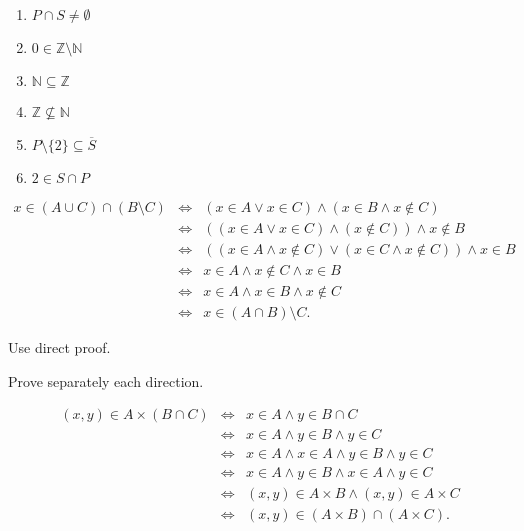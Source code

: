 \begin{answer}{2.2}
    \begin{enumerate}[label=(\roman*)]
        \item $P\cap S \neq \emptyset$
        \item $0 \in \mathbb{Z}\setminus \mathbb{N}$
        \item $\mathbb{N}\subseteq \mathbb{Z}$
        \item $\mathbb{Z}\nsubseteq \mathbb{N}$
        \item $P\setminus \{2\} \subseteq \overline{S}$
        \item $2\in S\cap P$
    \end{enumerate}
\end{answer}
\begin{answer}{2.4}
\begin{eqnarray*}
x\in (A\cup C)\cap (B\setminus C) &\Leftrightarrow & (x\in A \vee x\in C) \wedge (x\in B \wedge x\notin C)\\
 &\Leftrightarrow & ((x\in A \vee x\in C) \wedge (x\notin C))\wedge x\notin B\\
&\Leftrightarrow & ((x\in A \wedge x\notin C) \vee (x\in C \wedge x\notin C)) \wedge
 x\in B\\
&\Leftrightarrow & x\in A \wedge x\notin C  \wedge x\in B\\
&\Leftrightarrow & x\in A \wedge x\in B  \wedge x\notin C \\
&\Leftrightarrow & x \in (A\cap B)\setminus C.
\end{eqnarray*}
\end{answer}
\begin{answer}{2.5}
    Use direct proof.
\end{answer}
\begin{answer}{2.6}
    Prove separately each direction.
\end{answer}
\begin{answer}{2.7}

\begin{eqnarray*}
(x,y)\in A\times (B\cap C) &\Leftrightarrow & x \in A \wedge y\in B\cap C\\
&\Leftrightarrow & x \in A \wedge y\in B  \wedge y\in C\\
&\Leftrightarrow & x \in A \wedge x \in A\wedge y\in B  \wedge y\in C\\
&\Leftrightarrow & x \in A \wedge  y\in B  \wedge x \in A\wedge y\in C\\
&\Leftrightarrow & (x,y) \in A\times B \wedge  (x,y) \in A\times C\\
&\Leftrightarrow & (x,y) \in (A\times B)\cap   (A\times C).
\end{eqnarray*}
\end{answer}
